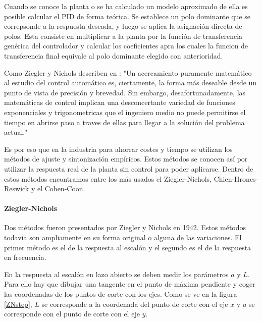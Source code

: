 \documentclass{book}
\begin{document}
Cuando se conoce la planta o se ha calculado un modelo aproximado de ella es posible calcular el PID de forma te\'orica. Se establece un polo dominante que se correpsonde a la respuesta deseada, y luego se aplica la asignaci\'on directa de polos. Esta consiste en multiplicar a la planta por la funci\'on de transferencia gen\'erica del controlador y calcular los coeficientes apra los cuales la funcion de transferencia final equivale al polo dominante elegido con anterioridad. \par

Como Ziegler y Nichols describen en \cite{ZNoriginal}: "Un acercamiento puramente matem\'atico al estudio del control autom\'atico es, ciertamente, la forma más deseable desde un punto de vista de precisi\'on y brevedad. Sin embargo, desafortunadamente, las matem\'aticas de control implican una desconcertante variedad de funciones exponenciales y trigonometricas que el ingeniero medio no puede permitirse el tiempo en abrirse paso a traves de ellas para llegar a la soluci\'on del problema actual." \par

Es por eso que en la industria para ahorrar costes y tiempo se utilizan los m\'etodos de ajuste y sintonizaci\'on emp\'iricos. Estos m\'etodos se conocen as\'i por utilizar la respuesta real de la planta sin control para poder aplicarse. Dentro de estos m\'etodos encontramos entre los m\'as usados el Ziegler-Nichols, Chien-Hrones-Reswick y el Cohen-Coon.\par

		\paragraph{Ziegler-Nichols}

Dos m\'etodos fueron presentados por Ziegler y Nichols en 1942. Estos m\'etodos todavia son ampliamente en su forma original o alguna de las variaciones. El primer m\'etodo es el de la respuesta al escal\'on y el segundo es el de la respuesta en frecuencia. \par 

En la respuesta al escal\'on en lazo abierto se deben medir los par\'ametros $a$ y $L$. Para ello hay que dibujar una tangente en el punto de m\'axima pendiente y coger las coordenadas de los puntos de corte con los ejes. Como se ve en la figura \ref{ZNstep}, $L$ se corresponde a la coordenada del punto de corte con el eje $x$ y $a$ se corresponde con el punto de corte con el eje $y$. 
\end{document}
